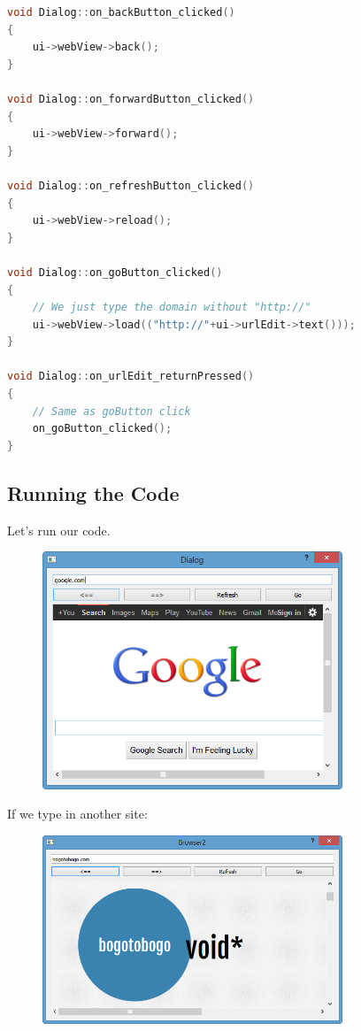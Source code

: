 \begin{lstlisting}[language=c++]
void Dialog::on_backButton_clicked()
{
    ui->webView->back();
}

void Dialog::on_forwardButton_clicked()
{
    ui->webView->forward();
}

void Dialog::on_refreshButton_clicked()
{
    ui->webView->reload();
}

void Dialog::on_goButton_clicked()
{
    // We just type the domain without "http://"
    ui->webView->load(("http://"+ui->urlEdit->text()));
}

void Dialog::on_urlEdit_returnPressed()
{
    // Same as goButton click
    on_goButton_clicked();
}
\end{lstlisting}

\subsection{Running the Code}\label{running-the-code}

Let's run our code.

\begin{figure}[htbp]
\centering
\includegraphics[width=0.8\textwidth]{images/Browser2RunA.png}
\caption{}
\end{figure}

If we type in another site:

\begin{figure}[htbp]
\centering
\includegraphics[width=0.8\textwidth]{images/Browser2RunB.png}
\caption{}
\end{figure}

